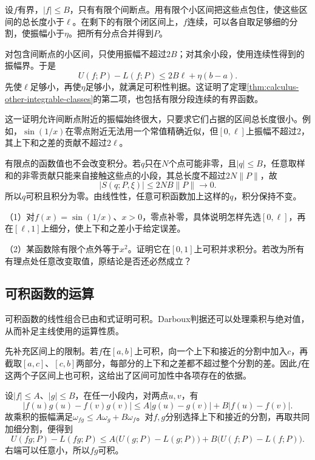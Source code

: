 设\(f\)有界，\(|f|\le B\)，只有有限个间断点。用有限个小区间把这些点包住，使这些区间的总长度小于\(\ell\)。在剩下的有限个闭区间上，\(f\)连续，可以各自取足够细的分割，使振幅小于\(\eta\)。把所有分点合并得到\(P\)。

对包含间断点的小区间，只使用振幅不超过\(2B\)；对其余小段，使用连续性得到的振幅界。于是
\begin{equation*}
 U(f;P)-L(f;P)\le2B\ell+\eta(b-a).
\end{equation*}
先使\(\ell\)足够小，再使\(\eta\)足够小，就满足可积性判据。这证明了定理\ref{thm:calculus-other-integrable-classes}的第二项，也包括有限分段连续的有界函数。

这一证明允许间断点附近的振幅始终很大，只要求它们占据的区间总长度很小。例如，\(\sin(1/x)\)在零点附近无法用一个常值精确近似，但\([0,\ell]\)上振幅不超过\(2\)，其上下和之差的贡献不超过\(2\ell\)。

有限点的函数值也不会改变积分。若\(q\)只在\(N\)个点可能非零，且\(|q|\le B\)，任意取样和的非零贡献只能来自接触这些点的小段，其总长度不超过\(2N\|P\|\)，故
\begin{equation*}
 |S(q;P,\xi)|\le2NB\|P\|\longrightarrow0.
\end{equation*}
所以\(q\)可积且积分为零。由线性性，任意可积函数加上这样的\(q\)，积分保持不变。

\begin{exercise}
\mbox{}\par\nobreak

（1）对\(f(x)=\sin(1/x)\)、\(x>0\)，零点补零，具体说明怎样先选\([0,\ell]\)，再在\([\ell,1]\)上细分，使上下和之差小于给定误差。

（2）某函数除有限个点外等于\(x^2\)。证明它在\([0,1]\)上可积并求积分。若改为所有有理点处任意改变取值，原结论是否还必然成立？
\end{exercise}

\subsection{可积函数的运算}

可积函数的线性组合已由和式证明可积。Darboux判据还可以处理乘积与绝对值，从而补足主线使用的运算性质。

先补充区间上的限制。若\(f\)在\([a,b]\)上可积，向一个上下和接近的分割中加入\(c\)，再截取\([a,c]\)、\([c,b]\)两部分，每部分的上下和之差都不超过整个分割的差。因此\(f\)在这两个子区间上也可积，这给出了区间可加性中各项存在的依据。

设\(|f|\le A\)、\(|g|\le B\)，在任一小段内，对两点\(u,v\)，有
\begin{equation*}
 |f(u)g(u)-f(v)g(v)|
 \le A|g(u)-g(v)|+B|f(u)-f(v)|.
\end{equation*}
故乘积的振幅满足\(\omega_{fg}\le A\omega_g+B\omega_f\)。对\(f,g\)分别选择上下和接近的分割，再取共同加细分割，便得到
\begin{equation*}
 U(fg;P)-L(fg;P)
 \le A\bigl(U(g;P)-L(g;P)\bigr)+B\bigl(U(f;P)-L(f;P)\bigr).
\end{equation*}
右端可以任意小，所以\(fg\)可积。

